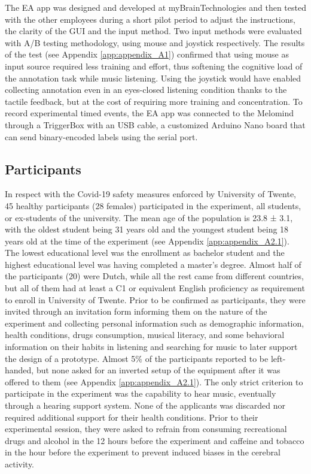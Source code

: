 The \ac{EA} app was designed and developed at myBrainTechnologies and then tested with the other employees during a short pilot period to adjust the instructions, the clarity of the GUI and the input method. Two input methods were evaluated with A/B testing methodology, using mouse and joystick respectively. The results of the test (see Appendix \ref{app:appendix_A1}) confirmed that using mouse as input source required less training and effort, thus softening the cognitive load of the annotation task while music listening. Using the joystick would have enabled collecting annotation even in an eyes-closed listening condition thanks to the tactile feedback, but at the cost of requiring more training and concentration. To record experimental timed events, the \ac{EA} app was connected to the Melomind through a TriggerBox with an USB cable, a customized Arduino Nano board that can send binary-encoded labels using the serial port. 

\subsection{Participants}
\label{sec:participants}
In respect with the Covid-19 safety measures enforced by University of Twente, 45 healthy participants (28 females) participated in the experiment, all students, or ex-students of the university. The mean age of the population is 23.8 ± 3.1, with the oldest student being 31 years old and the youngest student being 18 years old at the time of the experiment (see Appendix \ref{app:appendix_A2.1}). The lowest educational level was the enrollment as bachelor student and the highest educational level was having completed a master’s degree. Almost half of the participants (20) were Dutch, while all the rest came from different countries, but all of them had at least a C1 or equivalent English proficiency as requirement to enroll in University of Twente. Prior to be confirmed as participants, they were invited through an invitation form informing them on the nature of the experiment and collecting personal information such as demographic information, health conditions, drugs consumption, musical literacy, and some behavioral information on their habits in listening and searching for music to later support the design of a prototype. Almost 5\% of the participants reported to be left-handed, but none asked for an inverted setup of the equipment after it was offered to them (see Appendix \ref{app:appendix_A2.1}). The only strict criterion to participate in the experiment was the capability to hear music, eventually through a hearing support system. None of the applicants was discarded nor required additional support for their health conditions. Prior to their experimental session, they were asked to refrain from consuming recreational drugs and alcohol in the 12 hours before the experiment and caffeine and tobacco in the hour before the experiment to prevent induced biases in the cerebral activity.

